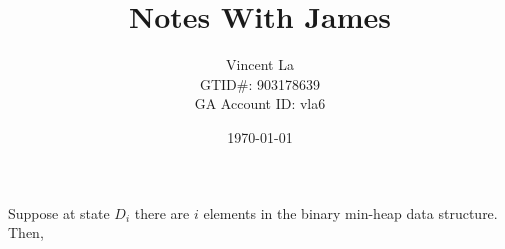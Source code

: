 \documentclass[12pt,a4paper]{article}
\author{Vincent La 
\\
GTID\#: 903178639
\\
GA Account ID: vla6}
\title{Notes With James}
\date{\today}
\begin{document}
\maketitle

Suppose at state $D_i$ there are $i$ elements in the binary min-heap data structure. Then, 
\end{document}
